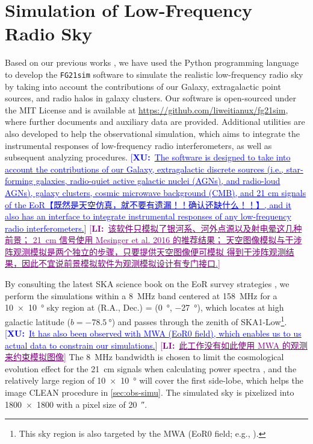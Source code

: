 \documentclass[modern]{aastex62}
\newcommand{\XU}[1]{\textcolor{blue}{[\textbf{XU:}~\uline{#1}]}}
\newcommand{\LI}[1]{\textcolor{purple}{[\textbf{LI:}~\uline{#1}]}}
\begin{document}
\section{Simulation of Low-Frequency Radio Sky}
\label{sec:sky-simu}

Based on our previous works \citep{wang2010,wang2013}, we have used the
Python programming language to develop the \texttt{FG21sim} software to
simulate the realistic low-frequency radio sky by taking into account the
contributions of our Galaxy, extragalactic point sources, and radio halos
in galaxy clusters.
Our software is open-sourced under the MIT License and is available at
\url{https://github.com/liweitianux/fg21sim},
where further documents and auxiliary data are provided.
Additional utilities are also developed to help the observational simulation,
which aims to integrate the instrumental responses of low-frequency radio
interferometers, as well as subsequent analyzing procedures.
\XU{The software is designed to take into account the
contributions of our Galaxy, extragalactic discrete sources (i.e.,
star-forming galaxies, radio-quiet active galactic nuclei (AGNs), and
radio-loud AGNs), galaxy clusters, cosmic microwave background (CMB), and 21
cm signals of the EoR【既然是天空仿真，就不要有遗漏！！确认还缺什么！！】,
and it also has an interface to integrate instrumental responses of any
low-frequency radio interferometers.}
\LI{该软件只模拟了银河系、河外点源以及射电晕这几种前景；
21~cm 信号使用 Mesinger et al. 2016 的推荐结果；
天空图像模拟与干涉阵观测模拟是两个独立的步骤，只要提供天空图像便可模拟
得到干涉阵观测结果，因此不宜说前景模拟软件为观测模拟设计有专门接口.}

By consulting the latest SKA science book on the EoR survey strategies
\citep[e.g.,][]{koopmans2015rev}, we perform the simulations within
a \SI{8}{\MHz} band centered at \SI{158}{\MHz} for a
\SI[product-units=repeat]{10 x 10}{\degree}
sky region at (R.A., Dec.) = (\SI{0}{\degree}, \SI{-27}{\degree}),
which locates at high galactic latitude ($b = \SI{-78.5}{\degree}$)
and passes through the zenith of SKA1-Low\footnote{%
  This sky region is also targeted by the MWA (EoR0 field;
  e.g., \citealt{beardsley2016}).}.
\XU{It has also been observed with MWA (EoR0 field), which enables us to us actual data to constrain our simulations.}
\LI{此工作没有如此使用 MWA 的观测来约束模拟图像}
The \SI{8}{\MHz} bandwidth is chosen to limit the cosmological evolution
effect for the 21~cm signals when calculating power spectra
\citep[e.g.][]{wyithe2004,thyagarajan2013},
and the relatively large region of \SI[product-units=repeat]{10 x 10}{\degree}
will cover the first side-lobe, which helps the image CLEAN procedure
in \autoref{sec:obs-simu}.
The simulated sky is pixelized into \num{1800 x 1800} with a pixel size
of \SI{20}{\arcsecond}.
\end{document}
